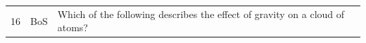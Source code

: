 \documentclass[10pt]{article}
\begin{document}
\begin{tiny}
\begin{longtable}{|r|p{0.375in}|p{1.275in}|p{3.5in}|}
16 &          BoS &                                                                                                                                                                                                      Which of the following describes the effect of gravity on a cloud of atoms? &                                                                                                                                                                                                                                                                                                                                                                                                                                                                                                                                                                                                                                                                                                                                                                                                                                                                                                                                                                                                                                                                                                                                                                                                                                                                                                                                                                                                                                                                                                                                                                                                                                                                                                                                                                                                                                                                                                                                                                                                                                                                                                                                                                                                                                                                                                                                                                                                                                                                                                                                                                                                                                                                                                                                                                                                                                                                                                                                                                                                                                                                                               
\end{longtable}
\end{tiny}
\end{document}

